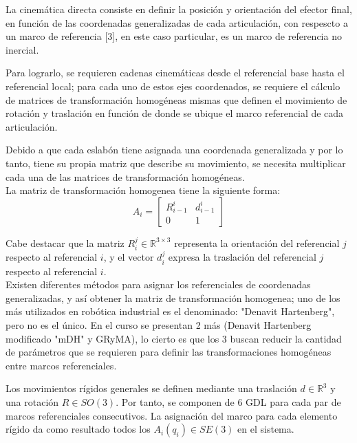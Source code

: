 
    \noindent La cinemática directa consiste en definir la posición y orientación del efector final, en función de las
    coordenadas generalizadas de cada articulación, con respescto a un marco de referencia [3], en este caso particular,
    es un marco de referencia no inercial.

    Para lograrlo, se requieren cadenas cinemáticas desde el referencial base hasta el referencial local; para cada uno de
    estos ejes coordenados, se requiere el cálculo de matrices de transformación homogéneas mismas que definen el movimiento
    de rotación y traslación en función de donde se ubique el marco referencial de cada articulación. 

    Debido a que cada eslabón tiene asignada una coordenada generalizada y por lo tanto, tiene su propia matriz que describe
    su movimiento, se necesita multiplicar cada una de las matrices de transformación homogéneas.
    \\
    La matriz de transformación homogenea tiene la siguiente forma:
    \begin{equation*} 
        A_i = 
        \begin{bmatrix}
        R^i_{i-1} & d^i_{i-1}\\
        0 & 1
        \end{bmatrix}
    \end{equation*}

    \noindent Cabe destacar que la matriz $R^j_i \in \mathbb{R}^{3\times 3}$ representa la orientación del referencial $j$
    respecto al referencial $i$, y el vector $d^j_{i}$ expresa la traslación del referencial $j$ respecto al referencial $i$.\\

    \noindent Existen diferentes métodos para asignar los referenciales de coordenadas generalizadas, y así obtener la matriz
    de transformación homogenea; uno de los más utilizados en robótica industrial es el denominado: "Denavit Hartenberg",
    pero no es el único. En el curso se presentan 2 más (Denavit Hartenberg modificado "mDH" y GRyMA), lo cierto es que los
    3 buscan reducir la cantidad de parámetros que se requieren para definir las transformaciones homogéneas entre marcos
    referenciales. 

    \noindent Los movimientos rígidos generales se definen mediante una traslación $d \in \mathbb{R}^3$ y una rotación
    $R \in SO(3)$. Por tanto, se componen de 6 GDL para cada par de marcos referenciales consecutivos. La asignación del marco
    para cada elemento rígido da como resultado todos los $A_i (q_i) \in SE(3)$ en el sistema.

